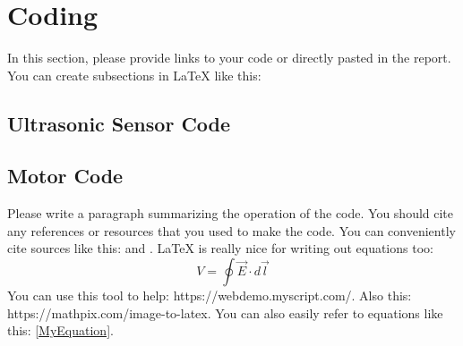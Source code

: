 \section{Coding}

In this section, please provide links to your code or directly pasted in the report. You can create subsections in LaTeX like this:
\subsection{Ultrasonic Sensor Code}
\subsection{Motor Code} 
Please write a paragraph summarizing the operation of the code. You should cite any references or resources that you used to make the code. You can conveniently cite sources like this: \cite{Manteghi2017} and \cite{Sheinker2013}. 
LaTeX is really nice for writing out equations too: 
\begin{equation}
V=\oint \overrightarrow{E}\cdot d\overrightarrow{l}  
\label{MyEquation}
\end{equation}
You can use this tool to help: https://webdemo.myscript.com/. Also this: https://mathpix.com/image-to-latex. 
You can also easily refer to equations like this: \ref{MyEquation}. 


